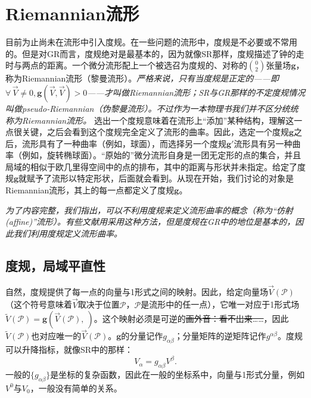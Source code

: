 \section{Riemannian流形}
\label{sec6.2}
目前为止尚未在流形中引入度规。在一些问题的流形中，度规是不必要或不常用的。但是对GR而言，度规绝对是最基本的，因为就像SR那样，度规描述了钟的走时与两点的距离。一个微分流形配上一个被选召为度规的、对称的$\binom{0}{2}$张量场$\mathbf{g}$，称为Riemannian流形（黎曼流形）。\textit{严格来说，只有当度规是正定的——即$\forall\, \vec{V} \neq 0, \mathbf{g} (\vec{V}, \vec{V}) > 0$——才叫做Riemannian流形；SR与GR那样的不定度规情况叫做pseudo-Riemannian（伪黎曼流形）。不过作为一本物理书我们并不区分统统称为Riemannian流形。} 选出一个度规意味着在流形上“添加”某种结构，理解这一点很关键，之后会看到这个度规完全定义了流形的曲率。因此，选定一个度规$\mathbf{g}$之后，流形具有了一种曲率（例如，球面），而选择另一个度规$\mathbf{g}'$流形具有另一种曲率（例如，旋转椭球面）。“原始的”微分流形自身是一团无定形的点的集合，并且局域的相似于欧几里得空间中的点的排布，其中的距离与形状并未指定。给定了度规$\mathbf{g}$就赋予了流形以特定形状，后面就会看到。从现在开始，我们讨论的对象是Riemannian流形，其上的每一点都定义了度规$\mathbf{g}$。

\textit{为了内容完整，我们指出，可以不利用度规来定义流形曲率的概念（称为“仿射 (affine)”流形）。有些文献用采用这种方法，但是度规在GR中的地位是基本的，因此我们利用度规定义流形曲率。}


\subsection*{度规，局域平直性}
自然，度规提供了每一点的向量与1形式之间的映射。因此，给定向量场$\vec{V} (\mathcal{P})$（这个符号意味着$\vec{V}$取决于位置$\mathcal{P}$，$\mathcal{P}$是流形中的任一点），它唯一对应于1形式场$\tilde{V} (\mathcal{P}) = \mathbf{g} (\vec{V} (\mathcal{P}), \ )$。这个映射必须是可逆的\sout{画外音：看不出来……}，因此$\tilde{V} (\mathcal{P})$也对应唯一的$\vec{V} (\mathcal{P})$。$\mathbf{g}$的分量记作$g_{\alpha \beta}$；分量矩阵的逆矩阵记作$g^{\alpha \beta}$。度规可以升降指标，就像SR中的那样：
\[
    V_\alpha = g_{\alpha \beta} V^\beta.
\]
一般的$\{ g_{\alpha \beta} \}$是坐标的复杂函数，因此在一般的坐标系中，向量与1形式分量，例如$V^0$与$V_0$，一般没有简单的关系。

